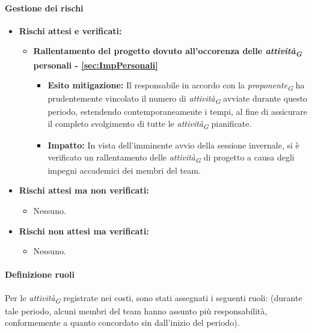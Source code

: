 \paragraph{Gestione dei rischi} 
\begin{itemize}
    \item \textbf{Rischi attesi e verificati:}
\begin{itemize}
    \item \textbf{Rallentamento del progetto dovuto all'occorenza delle \textit{attività}\textsubscript{\textit{G}} personali - \ref{sec:ImpPersonali}}
    \begin{itemize}
        \item \textbf{Esito mitigazione:}
            Il responsabile in accordo con la \textit{proponente}\textsubscript{\textit{G}} ha prudentemente vincolato il numero di \textit{attività}\textsubscript{\textit{G}} avviate durante questo periodo, estendendo contemporaneamente i tempi, al fine di assicurare il completo svolgimento di tutte le \textit{attività}\textsubscript{\textit{G}} pianificate.
        \item \textbf{Impatto:}
            In vista dell'imminente avvio della sessione invernale, si è verificato un rallentamento delle \textit{attività}\textsubscript{\textit{G}} di progetto a causa degli impegni accademici dei membri del team.
    \end{itemize}
\end{itemize}
\item \textbf{Rischi attesi ma non verificati:}
 \begin{itemize}
    \item Nessuno.
\end{itemize}
\item \textbf{Rischi non attesi ma verificati:}
\begin{itemize}
    \item Nessuno.
\end{itemize}
\end{itemize}

\paragraph{Definizione ruoli} \hspace{1pt}
Per le \textit{attività}\textsubscript{\textit{G}} registrate nei costi, sono stati assegnati i seguenti ruoli: (durante tale periodo, alcuni membri del team hanno assunto più responsabilità, conformemente a quanto concordato sin dall'inizio del periodo).


